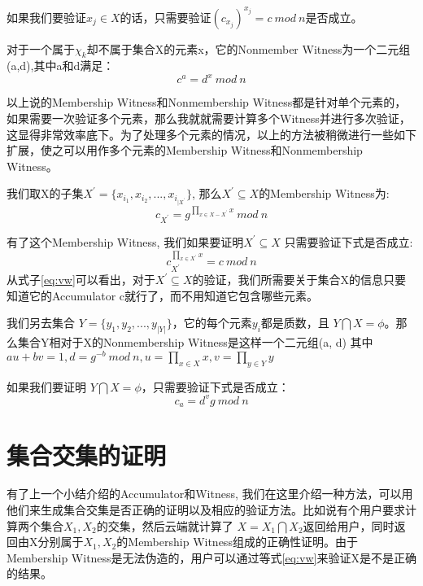 如果我们要验证$x_j \in X$的话，只需要验证$(c_{x_j})^{x_j} = c\ mod\ n$是否成立。

对于一个属于$\chi_k$却不属于集合X的元素x，它的Nonmember Witness为一个二元组(a,d),其中a和d满足：
\begin{equation} c^a = d^x\ mod\ n\end{equation}

以上说的Membership Witness和Nonmembership Witness都是针对单个元素的，如果需要一次验证多个元素，那么我就就需要计算多个Witness并进行多次验证，这显得非常效率底下。为了处理多个元素的情况，以上的方法被稍微进行一些如下扩展，使之可以用作多个元素的Membership Witness和Nonmembership Witness。

我们取X的子集$X^{\prime} = \{x_{i_1}, x_{i_2}, ... , x_{i_{|X^\prime}}\}$, 那么$X^\prime \subseteq X$的Membership Witness为:
\begin{equation} \label{eq:w} c_{X^\prime} = g^{\prod_{x \in X - X^\prime} x}\ mod\ n \end{equation}

有了这个Membership Witness, 我们如果要证明$X^\prime \subseteq X$ 只需要验证下式是否成立:
\begin{equation} \label{eq:vw} c_{X^\prime}^{\prod_{x \in X^\prime} x} = c\ mod\ n\end{equation}
从式子\ref{eq:vw}可以看出，对于$X^\prime \subseteq X$的验证，我们所需要关于集合X的信息只要知道它的Accumulator c就行了，而不用知道它包含哪些元素。

我们另去集合 $Y = \{y_1, y_2, ... , y_{|Y|}\}$，它的每个元素$y_i$都是质数，且 $Y \bigcap X = \phi$。那么集合Y相对于X的Nonmembership Witness是这样一个二元组(a, d) 其中
$au + bv = 1, d = g^{-b}\ mod\ n, u = \prod_{x \in X} x, v = \prod_{y \in Y} y$

如果我们要证明 $Y \bigcap X = \phi$，只需要验证下式是否成立：
\begin{equation} \label{eq:vnw} c_a = d^v g\ mod\ n \end{equation}

\section{集合交集的证明}
有了上一个小结介绍的Accumulator和Witness, 我们在这里介绍一种方法，可以用他们来生成集合交集是否正确的证明以及相应的验证方法。比如说有个用户要求计算两个集合$X_1, X_2$的交集，然后云端就计算了 $X = X_1 \bigcap X_2$返回给用户，同时返回由X分别属于$X_1, X_2$的Membership Witness组成的正确性证明。由于Membership Witness是无法伪造的，用户可以通过等式\ref{eq:vw}来验证X是不是正确的结果。

